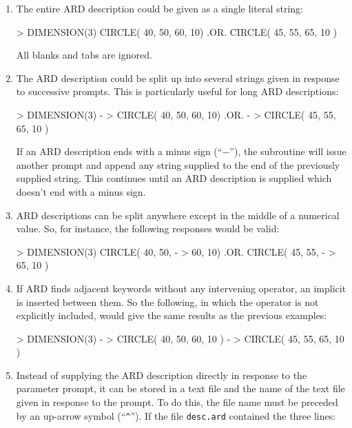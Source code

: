 \documentclass[11pt,nolof]{starlink}
\begin{document}
\begin{enumerate}

\item The entire ARD description could be given as a single literal string:

\small
\begin{terminalv}
      > DIMENSION(3) CIRCLE( 40, 50, 60, 10) .OR. CIRCLE( 45, 55, 65, 10 )
\end{terminalv}
\normalsize

All blanks and tabs are ignored.

\item The ARD description could be split up into several strings given in
response to successive prompts. This is particularly useful for long ARD
descriptions:

\small
\begin{terminalv}
      > DIMENSION(3) -
      > CIRCLE( 40, 50, 60, 10) .OR. -
      > CIRCLE( 45, 55, 65, 10 )
\end{terminalv}
\normalsize

If an ARD description ends with a minus sign (``$-$''), the  subroutine
will issue another prompt and append any string supplied to the end of the
previously supplied string. This continues until an ARD description is supplied
which doesn't end with a minus sign.

\item ARD descriptions can be split anywhere except in the middle of a numerical
value. So, for instance, the following responses would be valid:

\small
\begin{terminalv}
      > DIMENSION(3) CIRCLE( 40, 50, -
      > 60, 10) .OR. CIRCLE( 45, 55, -
      > 65, 10 )
\end{terminalv}
\normalsize

\item If ARD finds adjacent keywords without any intervening operator, an
implicit  is inserted between them. So the following, in which the 
operator is not explicitly included, would give the same results as the previous
examples:

\small
\begin{terminalv}
      > DIMENSION(3) -
      > CIRCLE( 40, 50, 60, 10 ) -
      > CIRCLE( 45, 55, 65, 10 )
\end{terminalv}
\normalsize

\item Instead of supplying the ARD description directly in response to the
parameter prompt, it can be stored in a text file and the name of the text file
given in response to the prompt. To do this, the file name must be
preceded by an up-arrow symbol (``\verb+^+''). If the file \verb+desc.ard+
contained the three lines:


\end{enumerate}
\end{document}
